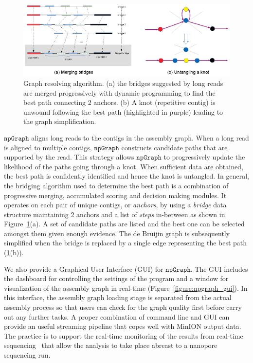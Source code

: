 \documentclass[10pt,letterpaper]{article}
\newcommand{\npgraph}{$\mathtt{npGraph}$}
\begin{document}
\begin{figure}[!hpt]
\centering
\includegraphics[width=\textwidth]{images/Fig1.eps}
\caption{Graph resolving algorithm. (a) the bridges suggested by long reads are merged progressively with dynamic programming to find the best path connecting 2 anchors. (b) A knot (repetitive contig) is unwound following the best path (highlighted in purple) leading to the graph simplification.}
\label{figure:npgraph_pipeline}
\end{figure}

\npgraph{} aligns long reads to the contigs in the assembly graph. When a long read is aligned
to multiple contigs, \npgraph{} constructs candidate paths that are supported by the read. This strategy allows \npgraph{} to progressively update the likelihood of the paths going through a knot.
When sufficient data are obtained, the best path is confidently identified and hence the knot is untangled.
In general, the bridging algorithm used to determine the best path is a combination of progressive merging, accumulated scoring and decision making modules.
It operates on each pair of unique contigs, or \emph{anchors}, by using a \emph{bridge} data structure maintaining 2 anchors and a list of \emph{steps} in-between as shown in Figure~\ref{figure:npgraph_pipeline}(a). 
A set of candidate paths are listed and the best one can be selected amongst them given enough evidence. 
The de Bruijin graph is subsequently simplified when the bridge is replaced by a single edge representing the best path (\ref{figure:npgraph_pipeline}(b)).


We also provide a Graphical User Interface (GUI) for \npgraph{}. The GUI includes the dashboard for controlling the settings of the program and a window for visualization of the assembly graph 
in real-time (Figure~\ref{figure:npgraph_gui}). 
In this interface, the assembly graph loading stage is separated from the actual assembly process so that users can check for the graph quality first before carry out any further tasks.
A proper combination of command line and GUI can provide an useful streaming pipeline that copes well with MinION output data. The practice is to support the real-time monitoring of
the results from real-time sequencing~\cite{CaoGC2016,Cao2017scaffolding,Nguyen2017barcode} that allow the analysis to take place abreast to a nanopore sequencing run.
\end{document}
